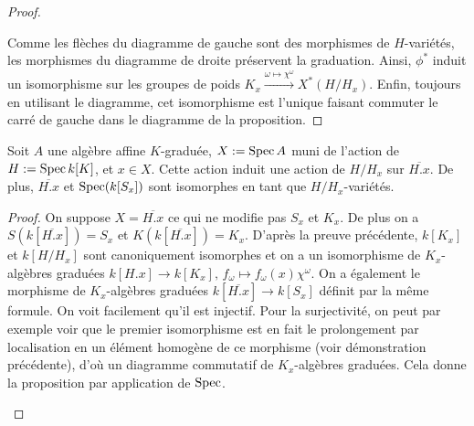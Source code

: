 \begin{proof}
\begin{multicols}{2}
	\columnbreak
	\begin{center}
	\end{center}
\end{multicols}
Comme les flèches du diagramme de gauche sont des morphismes de $H$-variétés, les morphismes du diagramme de droite préservent la graduation. Ainsi, $\phi^*$ induit un isomorphisme sur les groupes de poids $K_x \xrightarrow{\omega \mapsto\chi^{\omega}}X^*(H/H_x)$. Enfin, toujours en utilisant le diagramme, cet isomorphisme est l'unique faisant commuter le carré de gauche dans le diagramme de la proposition.
\end{proof}

\begin{prop}
Soit $A$ une algèbre affine $K$-graduée, $X:=\operatorname{Spec} A$ muni de l'action de $H:=\operatorname{Spec} k[K]$, et $x\in X$. Cette action induit une action de $H/H_x$ sur $\overline{H.x}$. De plus, $\overline{H.x}$ et $\operatorname{Spec}(k[S_x])$ sont isomorphes en tant que $H/H_x$-variétés.
\end{prop}
\begin{proof}
On suppose $X=\overline{H.x}$ ce qui ne modifie pas $S_x$ et $K_x$. De plus on a $S(k[\overline{H.x}])=S_x$ et $K(k[\overline{H.x}])=K_x$. D'après la preuve précédente, $k[K_x]$ et $k[H/H_x]$ sont canoniquement isomorphes et on a un isomorphisme de $K_x$-algèbres graduées $k[H.x]\rightarrow k[K_x],\, f_\omega \mapsto f_\omega(x)\chi^{\omega}$. On a également le morphisme de $K_x$-algèbres graduées $k[\overline{H.x}]\rightarrow k[S_x]$ définit par la même formule. On voit facilement qu'il est injectif. Pour la surjectivité, on peut par exemple voir que le premier isomorphisme est en fait le prolongement par localisation en un élément homogène de ce morphisme (voir démonstration précédente), d'où un diagramme commutatif de $K_x$-algèbres graduées. Cela donne la proposition par application de $\operatorname{Spec}$.

	\begin{center}
	\end{center}

\end{proof}

